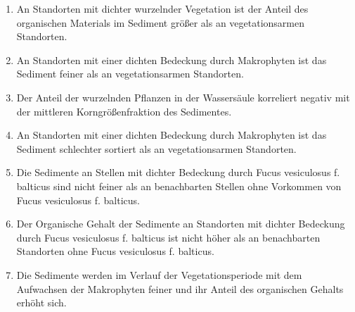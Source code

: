 \begin{enumerate}[label=\Roman{*},leftmargin=1.5cm]

\item An Standorten mit dichter wurzelnder Vegetation ist der Anteil des organischen Materials im Sediment größer als an vegetationsarmen Standorten.

\item An Standorten mit einer dichten Bedeckung durch Makrophyten ist das Sediment feiner als an vegetationsarmen Standorten.  

\item Der Anteil der wurzelnden Pflanzen in der Wassersäule korreliert negativ mit der mittleren Korngrößenfraktion des Sedimentes.

\item An Standorten mit einer dichten Bedeckung durch Makrophyten ist das Sediment schlechter sortiert als an vegetationsarmen Standorten.

\item Die Sedimente an Stellen mit dichter Bedeckung durch Fucus vesiculosus f. balticus sind nicht feiner als an benachbarten Stellen ohne Vorkommen von Fucus vesiculosus f. balticus.

\item Der Organische Gehalt der Sedimente an Standorten mit dichter Bedeckung durch Fucus vesiculosus f. balticus ist nicht höher als an benachbarten Standorten ohne Fucus vesiculosus f. balticus. 

\item Die Sedimente werden im Verlauf der Vegetationsperiode mit dem Aufwachsen der Makrophyten feiner und ihr Anteil des organischen Gehalts erhöht sich.

\end{enumerate}


